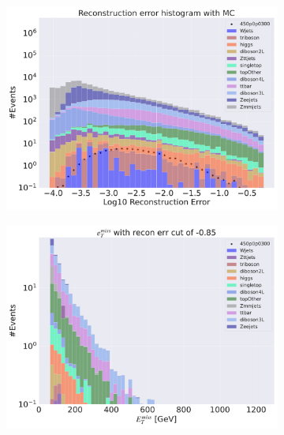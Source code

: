\begin{figure}[H]
    \centering
    \begin{subfigure}{.40\textwidth}
        \includegraphics[width=\textwidth]{Figures/AE_testing/small/3lep/b_data_recon_big_rm3_feats_sig_450p0p0300.pdf}
        \caption{ }
        \label{fig:AE_3lep_small_450_3}
    \end{subfigure}
    \hfill
    \begin{subfigure}{.40\textwidth}
        \includegraphics[width=\textwidth]{Figures/AE_testing/small/3lep/b_data_recon_big_rm3_feats_sig_450p0p0300_etmiss_recon_errcut_-0.85.pdf}
        \caption{}
        \label{fig:AE_3lep_small_etmiss_450_3}
    \end{subfigure}

\end{figure}
